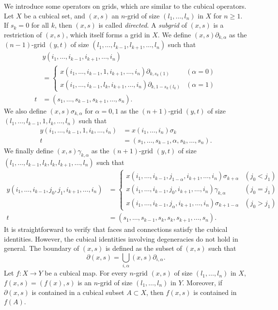 \documentclass[oneside, 12pt]{amsart}
\numberwithin{equation}{section}
\theoremstyle{plain}
\theoremstyle{definition}
\theoremstyle{remark}
\begin{document}
	We introduce some operators on grids, which are similar to the cubical operators. Let $X$ be a cubical set, and $(x,s)$ an $n$-grid of size $(l_1,\ldots,l_n)$ in $X$ for $n\ge 1$. If $s_{k}=0$ for all $k$, then $(x,s)$ is called \emph{directed}. A \emph{subgrid} of $(x,s)$ is a restriction of $(x,s)$, which itself forms a grid in $X$. We define $(x,s)\partial_{k,\alpha}$ as the $(n-1)$-grid $(y,t)$ of size $(l_1,\ldots,l_{k-1},l_{k+1},\ldots,l_n)$ such that
	\begin{align*}
		&y(i_1,\ldots,i_{k-1},i_{k+1},\ldots,i_n)\\
		&=
		\begin{cases}
			x(i_1,\ldots,i_{k-1},1,i_{k+1},\ldots,i_n)\partial_{k,s_k(1)}&(\alpha=0)\\
			x(i_1,\ldots,i_{k-1},l_k,i_{k+1},\ldots,i_n)\partial_{k,1-s_k(l_k)}&(\alpha=1)
		\end{cases}\\
		t&=(s_1,\ldots,s_{k-1},s_{k+1},\ldots,s_n).
	\end{align*}
	We also define $(x,s)\sigma_{k,\alpha}$ for $\alpha=0,1$ as the $(n+1)$-grid $(y,t)$ of size $(l_1,\ldots,l_{k-1},1,l_k,\ldots,l_n)$ such that
	\begin{align*}
		y(i_1,\ldots,i_{k-1},1,i_k,\ldots,i_n)&=x(i_1,\ldots,i_n)\sigma_k\\
		t&=(s_1,\ldots,s_{k-1},\alpha,s_{k},\ldots,s_n).
	\end{align*}
	We finally define $(x,s)\gamma_{k,\alpha}$ as the $(n+1)$-grid $(y,t)$ of size $(l_1,\ldots,l_{k-1},l_k,l_k,l_{k+1},\ldots,l_n)$ such that
	\begin{align*}
		y(i_1,\ldots,i_{k-1},j_0,j_1,i_{k+1},\ldots,i_n)&=
		\begin{cases}
			x(i_1,\ldots,i_{k-1},j_{1-\alpha},i_{k+1},\ldots,i_n)\sigma_{k+\alpha}&(j_0<j_1)\\
			x(i_1,\ldots,i_{k-1},j_0,i_{k+1},\ldots,i_n)\gamma_{k,\alpha}&(j_0=j_1)\\
			x(i_1,\ldots,i_{k-1},j_\alpha,i_{k+1},\ldots,i_n)\sigma_{k+1-\alpha}&(j_0>j_1)
		\end{cases}\\
		t&=(s_1,\ldots,s_{k-1},s_k,s_k,s_{k+1},\ldots,s_n).
	\end{align*}
	It is straightforward to verify that faces and connections satisfy the cubical identities. However, the cubical identities involving degeneracies do not hold in general. %
	The boundary of $(x,s)$ is defined as the subset of $(x,s)$ such that
	\[
	\partial(x,s)=\bigcup_{i,\alpha}(x,s)\partial_{i,\alpha}.
	\]
	Let $f\colon X\to Y$ be a cubical map. For every $n$-grid $(x,s)$ of size $(l_1,\ldots,l_n)$ in $X$, $f(x,s)=(f(x),s)$ is an $n$-grid of size $(l_1,\ldots,l_n)$ in $Y$. Moreover, if $\partial(x,s)$ is contained in a cubical subset $A\subset X$, then $f(x,s)$ is contained in $f(A)$.
	
\end{document}
